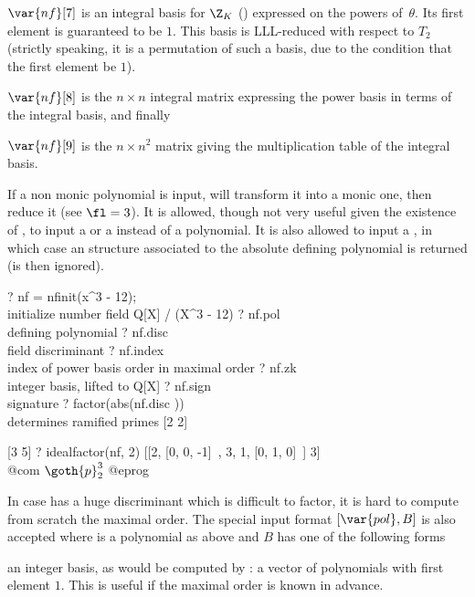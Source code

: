 $\var{nf}[7]$ is an integral basis for $\Z_K$ () expressed
on the powers of~$\theta$. Its first element is guaranteed to be $1$. This
basis is LLL-reduced with respect to $T_2$ (strictly speaking, it is a
permutation of such a basis, due to the condition that the first element be
$1$).

$\var{nf}[8]$ is the $n\times n$ integral matrix expressing the power
basis in terms of the integral basis, and finally

$\var{nf}[9]$ is the $n\times n^2$ matrix giving the multiplication table
of the integral basis.

If a non monic polynomial is input,  will transform it into a
monic one, then reduce it (see $\fl=3$). It is allowed, though not very
useful given the existence of , to input a  or a
 instead of a polynomial. It is also allowed to
input a , in which case an  structure associated to the
absolute defining polynomial  is returned (\fl is then ignored).

\bprog
? nf = nfinit(x^3 - 12); \\ initialize number field Q[X] / (X^3 - 12)
? nf.pol   \\ defining polynomial
? nf.disc  \\ field discriminant
? nf.index \\ index of power basis order in maximal order
? nf.zk    \\ integer basis, lifted to Q[X]
? nf.sign  \\ signature
? factor(abs(nf.disc ))  \\ determines ramified primes
[2 2]

[3 5]
? idealfactor(nf, 2)
[[2, [0, 0, -1]~, 3, 1, [0, 1, 0]~] 3]  \\ @com $\goth{p}_2^3$
@eprog


In case  has a huge discriminant which is difficult to factor,
it is hard to compute from scratch the maximal order. The special input
format $[\var{pol}, B]$ is also accepted where  is a polynomial as
above and $B$ has one of the following forms

\item an integer basis, as would be computed by : a vector of
polynomials with first element $1$. This is useful if the maximal order is
known in advance.


